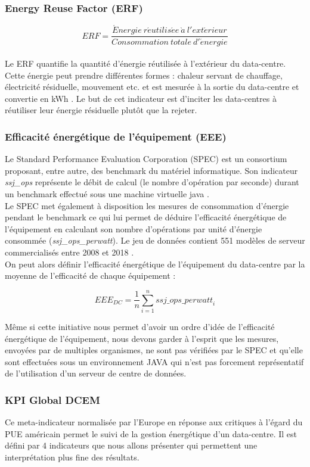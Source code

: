 \subsubsection{Energy Reuse Factor (ERF)}
\[ERF=\frac{\acute{E}nergie\ r\acute{e}utilis\acute{e}e\ \grave{a}\ l'ext\acute{e}rieur}{Consommation\ totale\ d'\acute{e}nergie}\]\\
Le ERF quantifie la quantité d'énergie réutilisée à l'extérieur du data-centre. Cette énergie peut prendre différentes formes : chaleur servant de chauffage, électricité résiduelle, mouvement etc. et est mesurée à la sortie du data-centre et convertie en kWh . Le but de cet indicateur est d'inciter les data-centres à réutiliser leur énergie résiduelle plutôt que la rejeter.

\subsubsection{Efficacité énergétique de l'équipement (EEE)}
Le Standard Performance Evaluation Corporation (SPEC) est un consortium proposant, entre autre, des \gls{benchmark} du matériel informatique. Son indicateur \emph{ssj\_ops} représente le débit de calcul (le nombre d'opération par seconde) durant un \gls{benchmark} effectué sous une machine virtuelle \gls{java} \cite{SPECpowerssj2008field}.\\

Le SPEC met également à disposition les mesures de consommation d'énergie pendant le \gls{benchmark} ce qui lui permet de déduire l'efficacité énergétique de l'équipement en calculant son nombre d'opérations par unité d'énergie consommée (\emph{ssj\_ops\_perwatt}). Le jeu de données contient 551 modèles de serveur commercialisés entre 2008 et 2018 \cite{SPECpowerssj2008}.\\

On peut alors définir l'efficacité énergétique de l'équipement du data-centre par la moyenne de l'efficacité de chaque équipement :

\[EEE_{DC}=\frac{1}{n}\sum_{i=1}^{n}{ssj\_ops\_perwatt}_i\]

Même si cette initiative nous permet d'avoir un ordre d'idée de l'efficacité énergétique de l'équipement, nous devons garder à l'esprit que les mesures, envoyées par de multiples organismes, ne sont pas vérifiées par le SPEC et qu'elle sont effectuées sous un environnement JAVA qui n'est pas forcement représentatif de l'utilisation d'un serveur de centre de données.

\subsubsection{KPI Global DCEM}
Ce meta-indicateur normalisée par l'Europe \cite{KPIDCEM} en réponse aux critiques à l'égard du PUE américain permet le suivi de la gestion énergétique d'un data-centre. Il est défini par 4 indicateurs que nous allons présenter qui permettent une interprétation plus fine des résultats.\\

